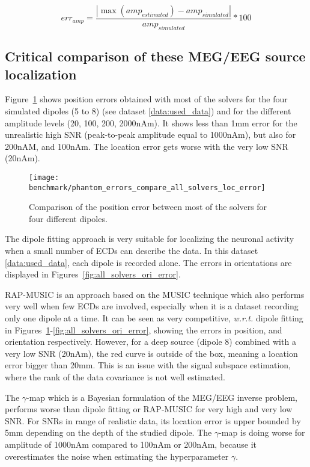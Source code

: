 \begin{equation}\label{eq:amp_err}
err_{amp} = \frac{|\max(amp_{estimated}) - amp_{simulated}|}{amp_{simulated}} * 100
\end{equation}

\subsection{Critical comparison of these MEG/EEG source localization}

Figure~\ref{fig:all_solvers_loc_error} shows position errors obtained with most of the solvers for the four simulated dipoles (5 to 8) (see dataset \ref{data:used_data}) and for the different amplitude levels (20, 100, 200, 2000nAm). It shows less than 1mm error for the unrealistic high \ac{SNR} (peak-to-peak amplitude equal to 1000nAm), but also for 200nAM, and 100nAm. The location error gets worse with the very low SNR (20nAm).

\begin{figure}[h!]
	\centering
    \texttt{[image: benchmark/phantom\_errors\_compare\_all\_solvers\_loc\_error]}
    \caption{Comparison of the position error between most of the solvers for four different dipoles. \label{fig:all_solvers_loc_error}}
\end{figure}

The dipole fitting approach is very suitable for localizing the neuronal activity when a small number of \ac{ECD}s can describe the data. In this dataset \ref{data:used_data}, each dipole is recorded alone. The errors in orientations are displayed in Figures~\ref{fig:all_solvers_ori_error}.

RAP-MUSIC is an approach based on the MUSIC technique which also performs very well when few ECDs are involved, especially when it is a dataset recording only one dipole at a time. It can be seen as very competitive, \textit{w.r.t.} dipole fitting in Figures~\ref{fig:all_solvers_loc_error}-\ref{fig:all_solvers_ori_error}, showing the errors in position, and orientation respectively. However, for a deep source (dipole 8) combined with a very low SNR (20nAm), the red curve is outside of the box, meaning a location error bigger than 20mm. This is an issue with the signal subspace estimation, where the rank of the data covariance is not well estimated.

The $\gamma$-map which is a Bayesian formulation of the MEG/EEG inverse problem,  performs worse than dipole fitting or RAP-MUSIC for very high and very low SNR. For SNRs in range of realistic data, its location error is upper bounded by 5mm depending on the depth of the studied dipole. The $\gamma$-map is doing worse for amplitude of 1000nAm compared to 100nAm or 200nAm, because it overestimates the noise when estimating the hyperparameter $\gamma$.

